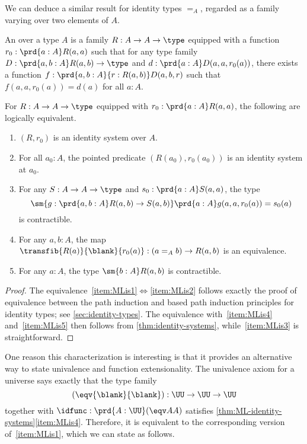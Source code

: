 %

We can deduce a similar result for identity types $=_A$, regarded as a family varying over two elements of $A$.

%

\begin{defn}
  An 
  over a type $A$ is a family $R:A\to A\to \type$ equipped with a function $r_0:\prd{a:A} R(a,a)$ such that for any type family $D:\prd{a,b:A} R(a,b) \to \type$ and $d:\prd{a:A} D(a,a,r_0(a))$, there exists a function $f:\prd{a,b:A}{r:R(a,b)} D(a,b,r)$ such that $f(a,a,r_0(a))=d(a)$ for all $a:A$.
\end{defn}

\begin{thm}\label{thm:ML-identity-systems}
  For $R:A\to A\to\type$ equipped with $r_0:\prd{a:A} R(a,a)$, the following are logically equivalent.
  \begin{enumerate}
  \item $(R,r_0)$ is an identity system over $A$.\label{item:MLis1}
  \item For all $a_0:A$, the pointed predicate $(R(a_0),r_0(a_0))$ is an identity system at $a_0$.\label{item:MLis2}
  \item For any $S:A\to A\to\type$ and $s_0:\prd{a:A} S(a,a)$, the type
    \[ \sm{g:\prd{a,b:A} R(a,b) \to S(a,b)} \prd{a:A} g(a,a,r_0(a)) = s_0(a) \]
    is contractible.\label{item:MLis3}
  \item For any $a,b:A$, the map $\transfib{R(a)}{\blank}{r_0(a)} : (a =_A b) \to R(a,b)$ is an equivalence.\label{item:MLis4}
  \item For any $a:A$, the type $\sm{b:A} R(a,b)$ is contractible.\label{item:MLis5}
  \end{enumerate}
\end{thm}
\begin{proof}
  The equivalence~\ref{item:MLis1}$\Leftrightarrow$\ref{item:MLis2} follows exactly the proof of equivalence between the path induction and based path induction principles for identity types; see \cref{sec:identity-types}.
  The equivalence with~\ref{item:MLis4} and~\ref{item:MLis5} then follows from \cref{thm:identity-systems}, while~\ref{item:MLis3} is straightforward.
\end{proof}

%

One reason this characterization is interesting is that it provides an alternative way to state univalence and function extensionality.
%
The univalence axiom for a universe \UU says exactly that the type family
\[ (\eqv{\blank}{\blank}) : \UU\to\UU\to\UU \]
together with $\idfunc : \prd{A:\UU} (\eqv AA)$ satisfies \cref{thm:ML-identity-systems}\ref{item:MLis4}.
Therefore, it is equivalent to the corresponding version of~\ref{item:MLis1}, which we can state as follows.

